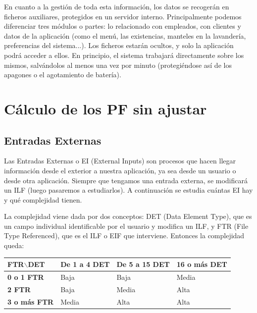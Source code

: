 \documentclass[spanish,a4paper,11pt, twoside]{report}	%
\begin{document}
En cuanto a la gestión de toda esta información, los datos se recogerán en ficheros auxiliares, protegidos en un servidor interno. Principalmente podemos diferenciar tres módulos o partes: lo relacionado con empleados, con clientes y datos de la aplicación (como el menú, las existencias, manteles en la lavandería, preferencias del sistema...). Los ficheros estarán ocultos, y solo la aplicación podrá acceder a ellos. En principio, el sistema trabajará directamente sobre los mismos, salvándolos al menos una vez por minuto (protegiéndose así de los apagones o el agotamiento de batería).

\section{Cálculo de los PF sin ajustar}
	\subsection{Entradas Externas}
	Las Entradas Externas o EI (External Inputs) son procesos que hacen llegar información desde el exterior a nuestra aplicación, ya sea desde un usuario o desde otra aplicación. Siempre que tengamos una entrada externa, se modificará un ILF (luego pasaremos a estudiarlos). A continuación se estudia cuántas EI hay y qué complejidad tienen. 

	La complejidad viene dada por dos conceptos: DET (Data Element Type), que es un campo individual identificable por el usuario y modifica un ILF, y FTR (File Type Referenced), que es el ILF o EIF que interviene. Entonces la complejidad queda: 

\vspace{0.35cm}
			\begin{tabular}{|p{3cm}||p{3cm}|p{3.2cm}|p{3cm}|}
				\hline
				\textbf{FTR$\backslash$DET} & \textbf{De 1 a 4 DET} & \textbf{De 5 a 15 DET} & \textbf{16  o más DET} \\ \hline \hline
				\textbf{0 o 1 FTR} & Baja & Baja & Media \\ \hline 
				\textbf{2 FTR} & Baja & Media & Alta \\ \hline 
				\textbf{3 o más FTR} & Media & Alta & Alta \\ \hline 
			\end{tabular}

\vspace{0.35cm}
\end{document}
